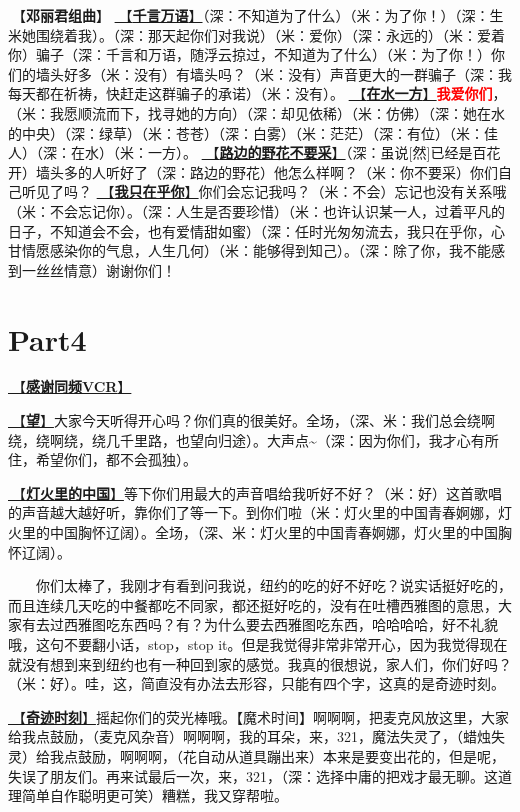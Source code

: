 \documentclass[]{ctexbook}
\begin{document}
🎵【\textbf{邓丽君组曲}】
\hyperref[thousands-of-words]{🎵【\textbf{千言万语}】}（深：不知道为了什么）（米：为了你！）（深：生米她围绕着我）。（深：那天起你们对我说）（米：爱你）（深：永远的）（米：爱着你）骗子（深：千言和万语，随浮云掠过，不知道为了什么）（米：为了你！）你们的墙头好多（米：没有）有墙头吗？（米：没有）声音更大的一群骗子（深：我每天都在祈祷，快赶走这群骗子的承诺）（米：没有）。
\hyperref[on-the-water-side]{🎵【\textbf{在水一方}】}\textbf{\textcolor{red}{我爱你们}}，（米：我愿顺流而下，找寻她的方向）（深：却见依稀）（米：仿佛）（深：她在水的中央）（深：绿草）（米：苍苍）（深：白雾）（米：茫茫）（深：有位）（米：佳人）（深：在水）（米：一方）。
\hyperref[only-with-me]{🎵【\textbf{路边的野花不要采}】}（深：虽说{[}然{]}已经是百花开）墙头多的人听好了（深：路边的野花）他怎么样啊？（米：你不要采）你们自己听见了吗？
\hyperref[only-you]{🎵【\textbf{我只在乎你}】}你们会忘记我吗？（米：不会）忘记也没有关系哦（米：不会忘记你）。（深：人生是否要珍惜）（米：也许认识某一人，过着平凡的日子，不知道会不会，也有爱情甜如蜜）（深：任时光匆匆流去，我只在乎你，心甘情愿感染你的气息，人生几何）（米：能够得到知己）。（深：除了你，我不能感到一丝丝情意）谢谢你们！

\section{Part4}\label{NewYork-20250309-part4}

\hyperref[thank-you-vcr]{🎥【\textbf{感谢同频VCR}】}

\hyperref[hope]{🎵【\textbf{望}】}大家今天听得开心吗？你们真的很美好。全场，（深、米：我们总会绕啊绕，绕啊绕，绕几千里路，也望向归途）。大声点\textasciitilde（深：因为你们，我才心有所住，希望你们，都不会孤独）。

\hyperref[China-in-the-light]{🎵【\textbf{灯火里的中国}】}等下你们用最大的声音唱给我听好不好？（米：好）这首歌唱的声音越大越好听，靠你们了等一下。到你们啦（米：灯火里的中国青春婀娜，灯火里的中国胸怀辽阔）。全场，（深、米：灯火里的中国青春婀娜，灯火里的中国胸怀辽阔）。

  你们太棒了，我刚才有看到问我说，纽约的吃的好不好吃？说实话挺好吃的，而且连续几天吃的中餐都吃不同家，都还挺好吃的，没有在吐槽西雅图的意思，大家有去过西雅图吃东西吗？有？为什么要去西雅图吃东西，哈哈哈哈，好不礼貌哦，这句不要翻小话，stop，stop it。但是我觉得非常非常开心，因为我觉得现在就没有想到来到纽约也有一种回到家的感觉。我真的很想说，家人们，你们好吗？（米：好）。哇，这，简直没有办法去形容，只能有四个字，这真的是奇迹时刻。

\hyperref[magic-moment]{🎵【\textbf{奇迹时刻}】}摇起你们的荧光棒哦。【魔术时间】啊啊啊，把麦克风放这里，大家给我点鼓励，（麦克风杂音）啊啊啊，我的耳朵，来，321，魔法失灵了，（蜡烛失灵）给我点鼓励，啊啊啊，（花自动从道具蹦出来）本来是要变出花的，但是呢，失误了朋友们。再来试最后一次，来，321，（深：选择中庸的把戏才最无聊。这道理简单自作聪明更可笑）糟糕，我又穿帮啦。
\end{document}
